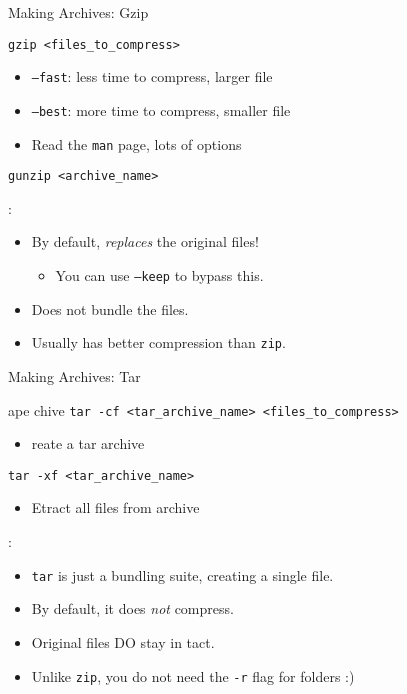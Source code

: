 \begin{frame}{Making Archives: Gzip}
  \begin{block}{}
    \texttt{gzip <files\_to\_compress>}
    \begin{itemize}
      \item \texttt{--fast}: less time to compress, larger file
      \item \texttt{--best}: more time to compress, smaller file
      \item Read the \texttt{man} page, lots of options
    \end{itemize}
  \end{block}
  \begin{block}{}
    \texttt{gunzip <archive\_name>}
  \end{block}
  :
  \begin{itemize}
    \item By default, \emph{replaces} the original files!
    \begin{itemize}
      \item You can use \texttt{--keep} to bypass this.
    \end{itemize}
    \item Does not bundle the files.
    \item Usually has better compression than \texttt{zip}.
  \end{itemize}
\end{frame}

\begin{frame}[fragile]{Making Archives: Tar}
  \begin{block}{ape chive}
    \texttt{tar -cf <tar\_archive\_name> <files\_to\_compress>}
    \begin{itemize}
      \item {}reate a tar archive
    \end{itemize}
    \texttt{tar -xf <tar\_archive\_name>}
    \begin{itemize}
      \item Etract all files from archive
    \end{itemize}
  \end{block}
  :
  \begin{itemize}
    \item \texttt{tar} is just a bundling suite, creating a single file.
    \item By default, it does \emph{not} compress.
    \item Original files DO stay in tact.
    \item Unlike \texttt{zip}, you do not need the \texttt{-r} flag for folders :)
  \end{itemize}
\end{frame}

